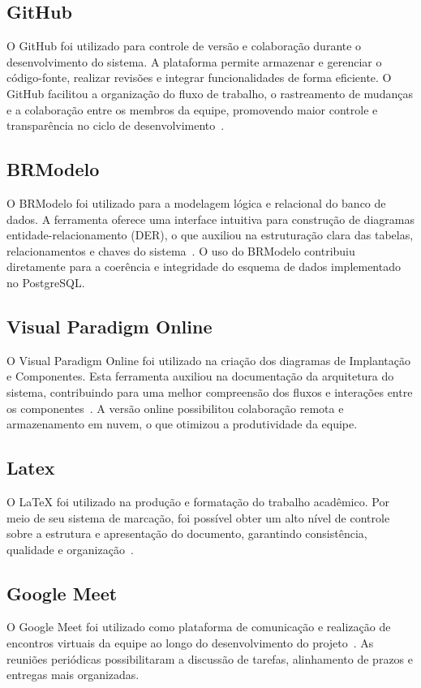 \documentclass[
	12pt,				%
	openany,			%
	oneside,			%
	a4paper,			%
	english,			%
	french,				%
	spanish,			%
	brazil				%
	]{abntex2}
\begin{document}
\subsection{GitHub}
O GitHub foi utilizado para controle de versão e colaboração durante o desenvolvimento do sistema. A plataforma permite armazenar e gerenciar o código-fonte, realizar revisões e integrar funcionalidades de forma eficiente. O GitHub facilitou a organização do fluxo de trabalho, o rastreamento de mudanças e a colaboração entre os membros da equipe, promovendo maior controle e transparência no ciclo de desenvolvimento~\cite{github-doc}.
\subsection{BRModelo}
O BRModelo foi utilizado para a modelagem lógica e relacional do banco de dados. A ferramenta oferece uma interface intuitiva para construção de diagramas entidade-relacionamento (DER), o que auxiliou na estruturação clara das tabelas, relacionamentos e chaves do sistema~\cite{brmodelo}. O uso do BRModelo contribuiu diretamente para a coerência e integridade do esquema de dados implementado no PostgreSQL.
\subsection{Visual Paradigm Online}
O Visual Paradigm Online foi utilizado na criação dos diagramas de Implantação e Componentes. Esta ferramenta auxiliou na documentação da arquitetura do sistema, contribuindo para uma melhor compreensão dos fluxos e interações entre os componentes~\cite{visual-paradigm}. A versão online possibilitou colaboração remota e armazenamento em nuvem, o que otimizou a produtividade da equipe.
\subsection{Latex}
O LaTeX foi utilizado na produção e formatação do trabalho acadêmico. Por meio de seu sistema de marcação, foi possível obter um alto nível de controle sobre a estrutura e apresentação do documento, garantindo consistência, qualidade e organização~\cite{latex-project}.

\subsection{Google Meet}
O Google Meet foi utilizado como plataforma de comunicação e realização de encontros virtuais da equipe ao longo do desenvolvimento do projeto~\cite{google-meet}. As reuniões periódicas possibilitaram a discussão de tarefas, alinhamento de prazos e entregas mais organizadas.
\end{document}
